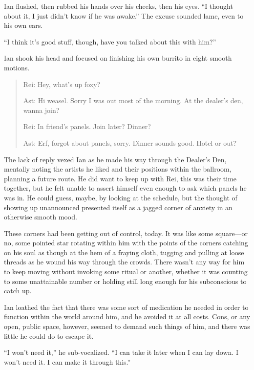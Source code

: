 Ian flushed, then rubbed his hands over his cheeks, then his eyes. ``I thought about it, I just didn't know if he was awake.'' The excuse sounded lame, even to his own ears.

``I think it's good stuff, though, have you talked about this with him?''

Ian shook his head and focused on finishing his own burrito in eight smooth motions.

\secdiv{}

\newpage

\begin{quote}
Rei: Hey, what's up foxy?

Ast: Hi weasel. Sorry I was out most of the morning. At the dealer's den, wanna join?

Rei: In friend's panels. Join later? Dinner?

Ast: Erf, forgot about panels, sorry. Dinner sounds good. Hotel or out?
\end{quote}

The lack of reply vexed Ian as he made his way through the Dealer's Den, mentally noting the artists he liked and their positions within the ballroom, planning a future route. He did want to keep up with Rei, this was their time together, but he felt unable to assert himself even enough to ask which panels he was in. He could guess, maybe, by looking at the schedule, but the thought of showing up unannounced presented itself as a jagged corner of anxiety in an otherwise smooth mood.

These corners had been getting out of control, today. It was like some square---or no, some pointed star rotating within him with the points of the corners catching on his soul as though at the hem of a fraying cloth, tugging and pulling at loose threads as he wound his way through the crowds. There wasn't any way for him to keep moving without invoking some ritual or another, whether it was counting to some unattainable number or holding still long enough for his subconscious to catch up.

Ian loathed the fact that there was some sort of medication he needed in order to function within the world around him, and he avoided it at all costs. Cons, or any open, public space, however, seemed to demand such things of him, and there was little he could do to escape it.

``I won't need it,'' he sub-vocalized. ``I can take it later when I can lay down. I won't need it. I can make it through this.''

